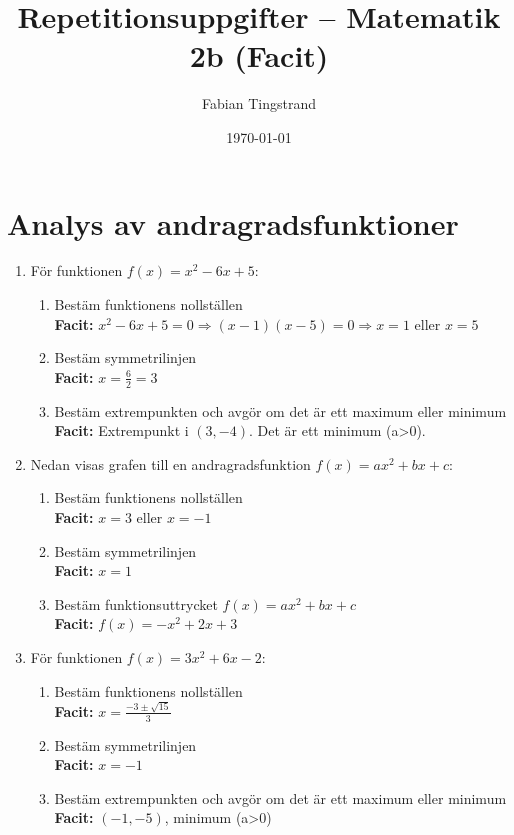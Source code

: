 \documentclass[a4paper,11pt]{article}
\title{Repetitionsuppgifter -- Matematik 2b (Facit)}
\author{Fabian Tingstrand}
\date{\today}
\begin{document}
\maketitle

\section{Analys av andragradsfunktioner}

\begin{enumerate}[label=\textbf{\arabic*.}]
    \item För funktionen $f(x) = x^2 - 6x + 5$:
    \begin{enumerate}[label=\alph*)]
        \item Bestäm funktionens nollställen
        \\ \textbf{Facit:} $x^2 - 6x + 5 = 0 \Rightarrow (x-1)(x-5)=0 \Rightarrow x=1$ eller $x=5$
        \item Bestäm symmetrilinjen
        \\ \textbf{Facit:} $x=\frac{6}{2}=3$
        \item Bestäm extrempunkten och avgör om det är ett maximum eller minimum
        \\ \textbf{Facit:} Extrempunkt i $(3, -4)$. Det är ett minimum (a>0).
    \end{enumerate}
    
    \item Nedan visas grafen till en andragradsfunktion $f(x) = ax^2 + bx + c$:
    
    
    \begin{enumerate}[label=\alph*)]
        \item Bestäm funktionens nollställen
        \\ \textbf{Facit:} $x=3$ eller $x=-1$
        \item Bestäm symmetrilinjen
        \\ \textbf{Facit:} $x=1$
        \item Bestäm funktionsuttrycket $f(x) = ax^2 + bx + c$
        \\ \textbf{Facit:} $f(x) = -x^2 + 2x + 3$
    \end{enumerate}

    \item För funktionen $f(x) = 3x^2 + 6x - 2$:
    \begin{enumerate}[label=\alph*)]
        \item Bestäm funktionens nollställen
        \\ \textbf{Facit:} $x = \frac{-3 \pm \sqrt{15}}{3}$
        \item Bestäm symmetrilinjen
        \\ \textbf{Facit:} $x=-1$
        \item Bestäm extrempunkten och avgör om det är ett maximum eller minimum
        \\ \textbf{Facit:} $(-1, -5)$, minimum (a>0)
    \end{enumerate}
    

\end{enumerate}
\end{document}
